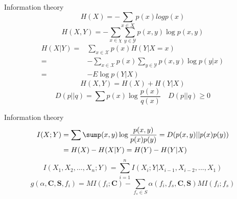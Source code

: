 \documentclass{beamer}
\begin{document}
\begin{frame}{Information theory}
\begin{equation}
H(X)=-\sum_{x \in X} p(x)log p(x)
\end{equation}
\begin{equation}
H(X,Y)=-\sum_{x\in \chi}\sum_{y\in \mathcal{Y}}p(x,y)\log p(x,y)
\end{equation}
\begin{equation}
\begin{split}
H(X|Y)=& \sum_{x\in \mathcal{X} }p(x)H(Y|X=x)\\
=& -\sum_{x\in \mathcal{X}}p(x)\sum_{y\in \mathcal{Y}}p(x,y)\log p(y|x) \\
=& -E\log p(Y|X)
\end{split}
\end{equation}
\begin{equation}
H(X,Y)=H(X)+H(Y|X)
\end{equation}
\begin{equation}
D(p||q)=\sum p(x)\log\frac{p(x)}{q(x)} \quad D(p||q)\geq 0
\end{equation}

\end{frame}

\begin{frame}{Information theory}
\begin{equation}
\begin{split}
I(X;Y)&=\sum\sump(x,y)\log\dfrac{p(x,y)}{p(x)p(y)}=D(p(x,y)||p(x)p(y)) \\
&=H(X)-H(X|Y)=H(Y)-H(Y|X)
\end{split}
\end{equation}
\begin{equation}
I(X_{1},X_{2},...,X_{n};Y)=\sum^{n}_{i=1}I(X_{i};Y|X_{i-1},X_{i-2},...,X_{1})
\end{equation}
\begin{equation}
g(\alpha,\textbf{C},\textbf{S},f_{i})=MI(f_{i};\textbf{C})-\sum_{f_{s}\in S}\alpha(f_{i},f_{s},\textbf{C},\textbf{S})MI(f_{i};f_{s})
\end{equation}
\end{frame}
\end{document}
